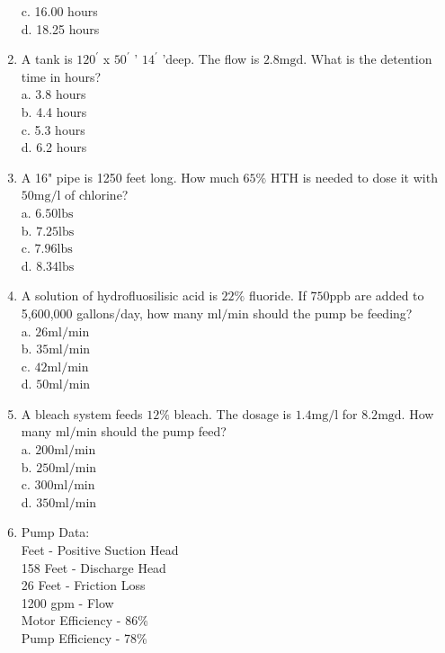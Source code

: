 \begin{enumerate}
c. 16.00 hours\\
d. 18.25 hours\\
\item A tank is $120^{\prime}$ x $50^{\prime}$ ' $14^{\prime}$ 'deep. The flow is $2.8 \mathrm{mgd}$. What is the detention time in hours?\\
a. 3.8 hours\\
b. 4.4 hours\\
c. 5.3 hours\\
d. 6.2 hours\\
\item A 16" pipe is 1250 feet long. How much $65 \%$ HTH is needed to dose it with $50 \mathrm{mg} / \mathrm{l}$ of chlorine?\\
a. $6.50 \mathrm{lbs}$\\
b. $7.25 \mathrm{lbs}$\\
c. $7.96 \mathrm{lbs}$\\
d. $8.34 \mathrm{lbs}$\\
\item A solution of hydrofluosilisic acid is $22 \%$ fluoride. If $750 \mathrm{ppb}$ are added to 5,600,000 gallons/day, how many $\mathrm{ml} / \mathrm{min}$ should the pump be feeding?\\
a. $26 \mathrm{ml} / \mathrm{min}$\\
b. $35 \mathrm{ml} / \mathrm{min}$\\
c. $42 \mathrm{ml} / \mathrm{min}$\\
d. $50 \mathrm{ml} / \mathrm{min}$\\
\item A bleach system feeds $12 \%$ bleach. The dosage is $1.4 \mathrm{mg} / \mathrm{l}$ for $8.2 \mathrm{mgd}$. How many $\mathrm{ml} / \mathrm{min}$ should the pump feed?\\
a. $200 \mathrm{ml} / \mathrm{min}$\\
b. $250 \mathrm{ml} / \mathrm{min}$\\
c. $300 \mathrm{ml} / \mathrm{min}$\\
d. $350 \mathrm{ml} / \mathrm{min}$\\
\item Pump Data:\\
Feet - Positive Suction Head\\
158 Feet - Discharge Head\\
26 Feet - Friction Loss\\
1200 gpm - Flow\\
Motor Efficiency - 86\%\\
Pump Efficiency - 78\%\\

\end{enumerate}
